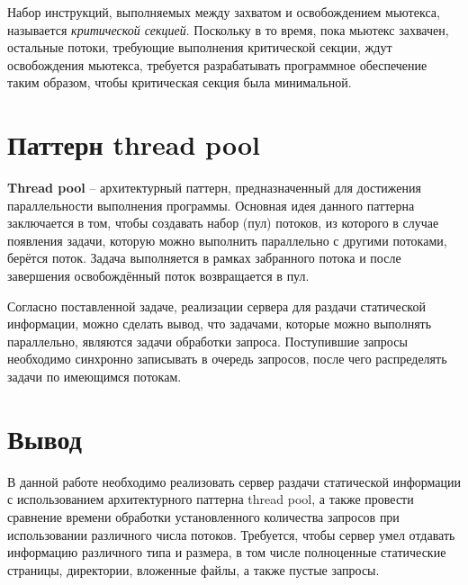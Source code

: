 Набор инструкций, выполняемых между захватом и освобождением мьютекса, называется \textit{критической секцией}. 
Поскольку в то время, пока мьютекс захвачен, остальные потоки, требующие выполнения критической секции, ждут освобождения мьютекса, требуется разрабатывать программное обеспечение таким образом, чтобы критическая секция была минимальной.

\section{Паттерн thread pool}
\textbf{Thread pool} \cite{thread-pool}	 -- архитектурный паттерн, предназначенный для достижения параллельности выполнения программы. 
Основная идея данного паттерна заключается в том, чтобы создавать набор (пул) потоков, из которого в случае появления задачи, которую можно выполнить параллельно с другими потоками, берётся поток.
Задача выполняется в рамках забранного потока и после завершения освобождённый поток возвращается в пул.

Согласно поставленной задаче, реализации сервера для раздачи статической информации, можно сделать вывод, что задачами, которые можно выполнять параллельно, являются задачи обработки запроса. Поступившие запросы необходимо синхронно записывать в очередь запросов, после чего распределять задачи по имеющимся потокам.

\section*{Вывод}
В данной работе необходимо реализовать сервер раздачи статической информации с использованием архитектурного паттерна thread pool, а также провести сравнение времени обработки установленного количества запросов при использовании различного числа потоков. Требуется, чтобы сервер умел отдавать информацию различного типа и размера, в том числе полноценные статические страницы, директории, вложенные файлы, а также пустые запросы.
